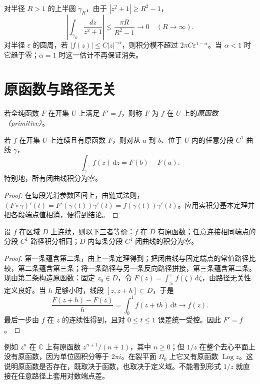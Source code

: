 \begin{example}[圆弧上的量级]
对半径 $R>1$ 的上半圆 $\gamma_R$，由于 $|z^2+1|\ge R^2-1$，
\[
 \left|\int_{\gamma_R}\frac{dz}{z^2+1}\right|
 \le\frac{\pi R}{R^2-1}\longrightarrow0\quad(R\to\infty).
\]
对半径 $\varepsilon$ 的圆周，若 $|f(z)|\le C|z|^{-\alpha}$，则积分模不超过 $2\pi C\varepsilon^{1-\alpha}$。当 $\alpha<1$ 时它趋于零；$\alpha=1$ 时这一估计不再保证消失。
\end{example}

\section{原函数与路径无关}

\begin{definition}[原函数]
若全纯函数 $F$ 在开集 $U$ 上满足 $F'=f$，则称 $F$ 为 $f$ 在 $U$ 上的\emph{原函数（primitive）}。
\end{definition}

\begin{theorem}[复积分的基本定理]
\label{thm:ca-fundamental}
若 $f$ 在开集 $U$ 上连续且有原函数 $F$，则对从 $a$ 到 $b$、位于 $U$ 内的任意分段 $C^1$ 曲线 $\gamma$，
\[
 \int_\gamma f(z)\,\mathrm dz=F(b)-F(a).
\]
特别地，所有闭曲线积分为零。
\end{theorem}
\begin{proof}
在每段光滑参数区间上，由链式法则，$(F\circ\gamma)'(t)=F'(\gamma(t))\gamma'(t)=f(\gamma(t))\gamma'(t)$。应用实积分基本定理并把各段端点值相消，便得到结论。
\end{proof}

\begin{theorem}[原函数存在的等价条件]
\label{thm:ca-primitive-equivalence}
设 $f$ 在区域 $D$ 上连续，则以下三者等价：$f$ 在 $D$ 有原函数；任意连接相同端点的分段 $C^1$ 路径积分相同；$D$ 内每条分段 $C^1$ 闭曲线的积分为零。
\end{theorem}
\begin{proof}
第一条蕴含第二条，由上一条定理得到；把闭曲线与固定端点的常值路径比较，第二条蕴含第三条；将一条路径与另一条反向路径拼接，第三条蕴含第二条。现由第二条构造原函数：固定 $z_0\in D$，令 $F(z)=\int_{z_0}^z f(\zeta)\,\mathrm d\zeta$，由路径无关性定义良好。当 $h$ 足够小时，线段 $[z,z+h]\subset D$，于是
\[
 \frac{F(z+h)-F(z)}h=\int_0^1f(z+th)\,\mathrm dt\longrightarrow f(z).
\]
最后一步由 $f$ 在 $z$ 的连续性得到，且对 $0\le t\le1$ 误差统一受控。因此 $F'=f$。
\end{proof}

例如 $z^n$ 在 $\mathbb C$ 上有原函数 $z^{n+1}/(n+1)$，其中 $n\ge0$；但 $1/z$ 在整个去心平面上没有原函数，因为单位圆积分等于 $2\pi i$。在裂平面 $\Omega_0$ 上它又有原函数 $\operatorname{Log}z$。这说明原函数是否存在，既取决于函数，也取决于定义域。不能看到形式 $1/z$ 就直接在任意路径上套用对数端点差。


